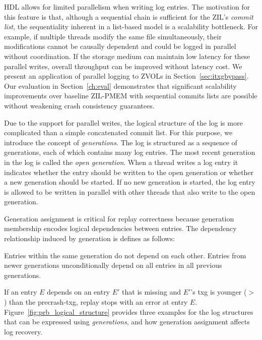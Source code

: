 \documentclass[12pt,a4paper,twoside]{book}
\begin{document}
HDL allows for limited parallelism when writing log entries.
The motivation for this feature is that, although a sequential chain is sufficient for the ZIL's \textit{commit list}, the sequentiality inherent in a list-based model is a scalability bottleneck.
For example, if multiple threads modify the same file simultaneously, their modifications cannot be causally dependent and could be logged in parallel without coordination.
If the storage medium can maintain low latency for these parallel writes, overall throughput can be improved without latency cost.
We present an application of parallel logging to ZVOLs in Section~\ref{sec:itxgbypass}.
Our evaluation in Section~\ref{ch:eval} demonstrates that significant scalability improvements over baseline ZIL-PMEM with sequential commits lists are possible without weakening crash consistency guarantees.

Due to the support for parallel writes, the logical structure of the log is more complicated than a simple concatenated commit list.
For this purpose, we introduce the concept of \textit{generations}.
The log is structured as a sequence of generations, each of which contains many log entries.
The most recent generation in the log is called the \textit{open generation}.
When a thread writes a log entry it indicates whether the entry should be written to the open generation or whether a new generation should be started.
If no new generation is started, the log entry is allowed to be written in parallel with other threads that also write to the open generation.

Generation assignment is critical for replay correctness because generation membership encodes logical dependencies between entries.
The dependency relationship induced by generation is defines as follows:
\begin{displayquote}
Entries within the same generation do not depend on each other.
Entries from newer generations unconditionally depend on all entries in all previous generations.
\end{displayquote}
If an entry $E$ depends on an entry $E'$ that is missing and $E'$'s txg is younger ($>$) than the precrash-txg, replay stops with an error at entry $E$.
Figure~\ref{fig:prb_logical_structure} provides three examples for the log structures that can be expressed using \textit{generations}, and how generation assignment affects log recovery.
\end{document}
